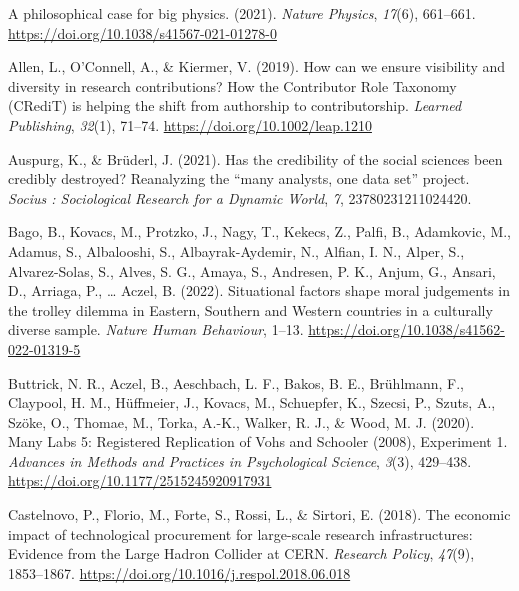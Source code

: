 \documentclass[
  man]{apa7}
\newlength{\cslhangindent}
\newlength{\cslentryspacingunit} %
\newenvironment{CSLReferences}[2] %
 {%
  \setlength{\parindent}{0pt}
  \ifodd #1
  \let\oldpar\par
  \def\par{\hangindent=\cslhangindent\oldpar}
  \fi
  \setlength{\parskip}{#2\cslentryspacingunit}
 }%
 {}
\begin{document}
\hypertarget{refs}{}
\begin{CSLReferences}{1}{0}
\leavevmode{}%
A philosophical case for big physics. (2021). \emph{Nature Physics}, \emph{17}(6), 661--661. \url{https://doi.org/10.1038/s41567-021-01278-0}

\leavevmode{}%
Allen, L., O'Connell, A., \& Kiermer, V. (2019). How can we ensure visibility and diversity in research contributions? How the Contributor Role Taxonomy (CRediT) is helping the shift from authorship to contributorship. \emph{Learned Publishing}, \emph{32}(1), 71--74. \url{https://doi.org/10.1002/leap.1210}

\leavevmode{}%
Auspurg, K., \& Brüderl, J. (2021). Has the credibility of the social sciences been credibly destroyed? Reanalyzing the {``}many analysts, one data set{''} project. \emph{Socius : Sociological Research for a Dynamic World}, \emph{7}, 23780231211024420.

\leavevmode{}%
Bago, B., Kovacs, M., Protzko, J., Nagy, T., Kekecs, Z., Palfi, B., Adamkovic, M., Adamus, S., Albalooshi, S., Albayrak-Aydemir, N., Alfian, I. N., Alper, S., Alvarez-Solas, S., Alves, S. G., Amaya, S., Andresen, P. K., Anjum, G., Ansari, D., Arriaga, P., \ldots{} Aczel, B. (2022). Situational factors shape moral judgements in the trolley dilemma in Eastern, Southern and Western countries in a culturally diverse sample. \emph{Nature Human Behaviour}, 1--13. \url{https://doi.org/10.1038/s41562-022-01319-5}

\leavevmode{}%
Buttrick, N. R., Aczel, B., Aeschbach, L. F., Bakos, B. E., Brühlmann, F., Claypool, H. M., Hüffmeier, J., Kovacs, M., Schuepfer, K., Szecsi, P., Szuts, A., Szöke, O., Thomae, M., Torka, A.-K., Walker, R. J., \& Wood, M. J. (2020). Many Labs 5: Registered Replication of Vohs and Schooler (2008), Experiment 1. \emph{Advances in Methods and Practices in Psychological Science}, \emph{3}(3), 429--438. \url{https://doi.org/10.1177/2515245920917931}

\leavevmode{}%
Castelnovo, P., Florio, M., Forte, S., Rossi, L., \& Sirtori, E. (2018). The economic impact of technological procurement for large-scale research infrastructures: Evidence from the Large Hadron Collider at CERN. \emph{Research Policy}, \emph{47}(9), 1853--1867. \url{https://doi.org/10.1016/j.respol.2018.06.018}


\end{CSLReferences}
\end{document}
